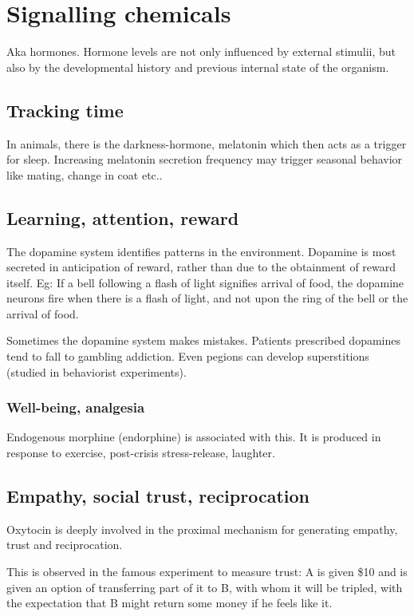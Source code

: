 \documentclass[oneside, article]{memoir}
\begin{document}
\chapter{Signalling chemicals}
Aka hormones. Hormone levels are not only influenced by external stimulii, but also by the developmental history and previous internal state of the organism.

\section{Tracking time}
In animals, there is the darkness-hormone, melatonin which then acts as a trigger for sleep. Increasing melatonin secretion frequency may trigger seasonal behavior like mating, change in coat etc..

\section{Learning, attention, reward}
The dopamine system identifies patterns in the environment. Dopamine is most  secreted in anticipation of reward, rather than due to the obtainment of reward itself. Eg: If a bell following a flash of light signifies arrival of food, the dopamine neurons fire when there is a flash of light, and not upon the ring of the bell or the arrival of food.

Sometimes the dopamine system makes mistakes. Patients prescribed dopamines tend to fall to gambling addiction. Even pegions can develop superstitions (studied in behaviorist experiments).

\subsection{Well-being, analgesia}
Endogenous morphine (endorphine) is associated with this. It is produced in response to exercise, post-crisis stress-release, laughter.

\section{Empathy, social trust, reciprocation}
Oxytocin is deeply involved in the proximal mechanism for generating empathy, trust and reciprocation.

This is observed in the famous experiment to measure trust: A is given \$10 and is given an option of transferring part of it to B, with whom it will be tripled, with the expectation that B might return some money if he feels like it.
\end{document}
